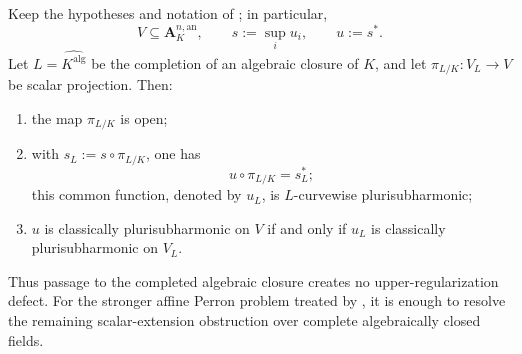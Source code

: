 
\begin{theorem}
\label{thm:p031-completed-algebraic-closure-reduction}
Keep the hypotheses and notation of
; in particular,
\[
 V\subseteq\mathbf A_K^{n,\mathrm{an}},
 \qquad
 s:=\sup_i u_i,
 \qquad
 u:=s^*.
\]
Let $L=\widehat{K^{\mathrm{alg}}}$ be the completion of an algebraic
closure of $K$, and let
$
 \pi_{L/K}:V_L\to V
$
be scalar projection.  Then:
\begin{enumerate}
\item the map $\pi_{L/K}$ is open;
\item with $s_L:=s\circ\pi_{L/K}$, one has
\begin{equation}
\label{eq:p031-no-completed-algebraic-closure-defect}
                    u\circ\pi_{L/K}=s_L^*;
\end{equation}
this common function, denoted by $u_L$, is
$L$-curvewise plurisubharmonic;
\item $u$ is classically plurisubharmonic on $V$ if and only if
$u_L$ is classically plurisubharmonic on $V_L$.
\end{enumerate}
Thus passage to the completed algebraic closure creates no
upper-regularization defect.  For the stronger affine Perron problem
treated by , it is enough to
resolve the remaining scalar-extension obstruction over complete
algebraically closed fields.
\end{theorem}
